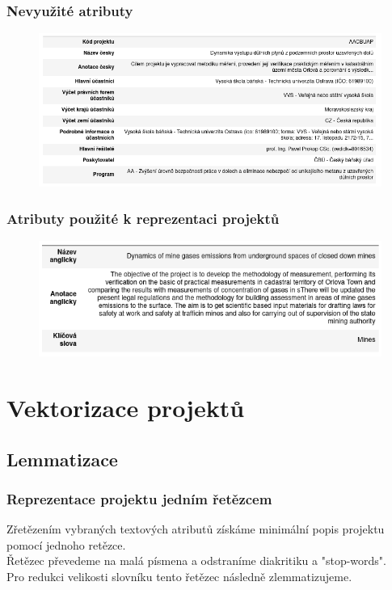 \documentclass{beamer}
\begin{document}
\begin{frame}
\frametitle{Nevyužité atributy}

  \begin{figure}[!h]
      \centering
      \includegraphics[width=.85\textwidth,height=\textheight,keepaspectratio]{figures/unused.png}
      \label{fig:unused}
  \end{figure}

\end{frame}

\begin{frame}
\frametitle{Atributy použité k reprezentaci projektů}

  \begin{figure}[!h]
      \centering
      \includegraphics[width=.7\textwidth,height=\textheight,keepaspectratio]{figures/used.png}
      \label{fig:used}
  \end{figure}

\end{frame}

\section{Vektorizace projektů}
\subsection{Lemmatizace}

\begin{frame}
\frametitle{Reprezentace projektu jedním řetězcem}

  \centering
  Zřetězením vybraných textových atributů získáme minimální popis projektu pomocí jednoho retězce. \\ \pause
  \vspace*{\fill}
  Řetězec převedeme na malá písmena a odstraníme diakritiku a "stop-words". \\ \pause
  \vspace*{\fill}
  Pro redukci velikosti slovníku tento řetězec následně zlemmatizujeme. \\

\end{frame}
\end{document}
